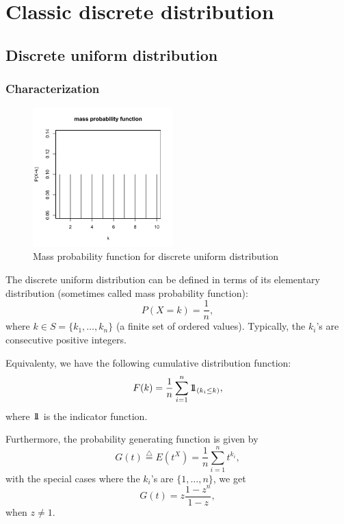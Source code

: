 \chapter{Classic discrete distribution}
\section{Discrete uniform distribution}
\subsection{Characterization}
\begin{figure}
  \vspace{-20pt}
  \begin{center}
    \includegraphics[width=0.48\textwidth]{img/discretunifzoom}
  \end{center}
  \vspace{-20pt}  
  \caption{Mass probability function for discrete uniform distribution}
  \vspace{-20pt}  
\end{figure}

The discrete uniform distribution can be defined in terms of its elementary distribution
(sometimes called mass probability function):
$$
P(X=k) = \frac{1}{n},
$$
where $k\in S=\{k_1, \dots, k_n\}$ (a finite set of ordered values). Typically, the $k_i$'s are consecutive positive integers.

Equivalenty, we have the following cumulative distribution function:
$$
F(k) = \frac{1}{n} \sum_{i=1}^n 1\!\!1_{(k_i\leq k)},
$$
where $1\!\!1$ is the indicator function.

Furthermore, the probability generating function is given by
$$
G(t) \stackrel{\triangle}{=} E(t^X) = \frac{1}{n} \sum_{i=1}^n t^{k_i},
$$
with the special cases where the  $k_i$'s are $\{1,\dots,n\}$, we get
$$
G(t) = z \frac{1-z^n}{1-z},
$$
when  $z\neq 1$.

